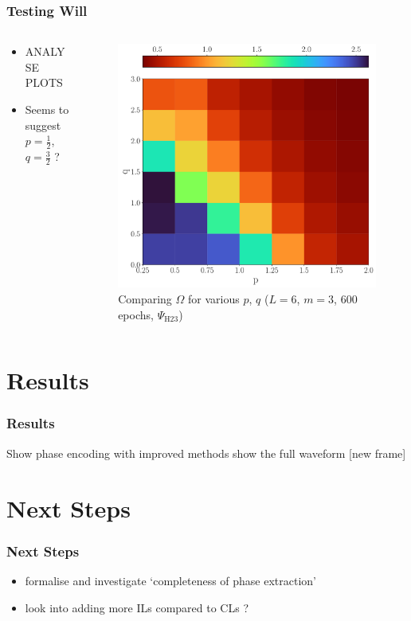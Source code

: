 \documentclass{beamer}
\begin{document}
\begin{frame}
\frametitle{Testing Will}
\begin{columns}
\begin{column}{0.5\textwidth}
\begin{itemize}
\item ANALYSE PLOTS
\item Seems to suggest $p=\frac{1}{2}$, $q=\frac{3}{2}$ ? 
\end{itemize}
\end{column}
\begin{column}{0.5\textwidth}
\begin{figure}
\centering 
\includegraphics[width=\textwidth]{im/omega_3_6_600}
\caption{Comparing $\Omega$ for various $p$, $q$ ($L=6$, $m=3$, 600 epochs, $\Psi_\text{H23}$)}
\end{figure}
\end{column}
\end{columns}
\end{frame}


\section{Results}

\begin{frame}
\frametitle{Results}
Show phase encoding with improved methods 
show the full waveform [new frame]
\end{frame}

\section{Next Steps}

\begin{frame}
\frametitle{Next Steps}
\begin{itemize}
\item formalise and investigate `completeness of phase extraction' 
\item look into adding more ILs compared to CLs ?
\end{itemize}
\end{frame}
\end{document}

